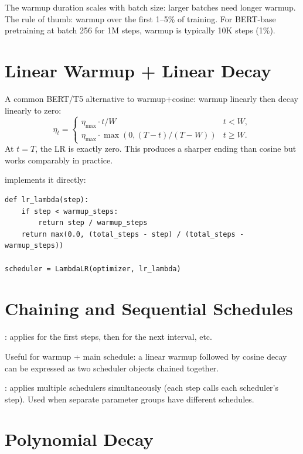 The warmup duration scales with batch size: larger batches
need longer warmup. The rule of thumb: warmup over the first
1--5\% of training. For BERT-base pretraining at batch 256
for 1M steps, warmup is typically 10K steps (1\%).

\section{Linear Warmup + Linear Decay}
\label{sec:lr_schedulers:linear_warmup_decay}

A common BERT/T5 alternative to warmup+cosine: warmup linearly
then decay linearly to zero:
\[
  \eta_t = \begin{cases}
    \eta_{\max} \cdot t / W & t < W, \\
    \eta_{\max} \cdot \max(0, (T - t) / (T - W)) & t \geq W.
  \end{cases}
\]
At $t = T$, the LR is exactly zero. This produces a sharper
ending than cosine but works comparably in practice.

 implements it directly:

\begin{lstlisting}[style=lucid,language=LucidPython]
def lr_lambda(step):
    if step < warmup_steps:
        return step / warmup_steps
    return max(0.0, (total_steps - step) / (total_steps - warmup_steps))

scheduler = LambdaLR(optimizer, lr_lambda)
\end{lstlisting}

\section{Chaining and Sequential Schedules}
\label{sec:lr_schedulers:chaining}

: applies
 for the first  steps,
then  for the next interval, etc.

Useful for warmup + main schedule: a linear warmup followed by
cosine decay can be expressed as two scheduler objects chained
together.

: applies multiple schedulers
simultaneously (each step calls each scheduler's step). Used
when separate parameter groups have different schedules.

\section{Polynomial Decay}
\label{sec:lr_schedulers:polynomial}

